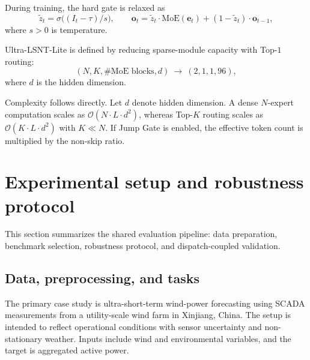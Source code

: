 \documentclass[review,1p,times]{elsarticle}
\begin{document}
During training, the hard gate is relaxed as
\[
\tilde z_t=\sigma\!\big((I_t-\tau)/s\big),\qquad
\mathbf{o}_t = \tilde z_t\cdot\mathrm{MoE}(\mathbf{e}_t) + (1-\tilde z_t)\cdot\mathbf{o}_{t-1},
\]
where $s>0$ is temperature.


Ultra-LSNT-Lite is defined by reducing sparse-module capacity with Top-$1$ routing:
\begin{equation}
(N,K,\text{\#MoE blocks},d) \ \rightarrow \ (2,1,1,96),
\end{equation}
where $d$ is the hidden dimension.


Complexity follows directly.\label{sec:complexity}
Let $d$ denote hidden dimension. A dense $N$-expert computation scales as $\mathcal{O}(N\cdot L \cdot d^2)$, whereas Top-$K$ routing scales as $\mathcal{O}(K\cdot L \cdot d^2)$ with $K\ll N$. If Jump Gate is enabled, the effective token count is multiplied by the non-skip ratio.


\section{Experimental setup and robustness protocol}
\label{sec:design}

This section summarizes the shared evaluation pipeline: data preparation, benchmark selection, robustness protocol, and dispatch-coupled validation.

\subsection{Data, preprocessing, and tasks}

The primary case study is ultra-short-term wind-power forecasting using SCADA measurements from a utility-scale wind farm in Xinjiang, China. The setup is intended to reflect operational conditions with sensor uncertainty and non-stationary weather. Inputs include wind and environmental variables, and the target is aggregated active power.
\end{document}
